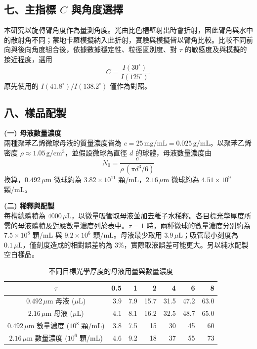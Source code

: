 \subsection*{七、主指標 $C$ 與角度選擇}
本研究以旋轉臂角度作為量測角度。光由比色槽壁射出時會折射，因此臂角與水中的散射角不同；蒙地卡羅模擬納入此折射，實驗與模擬皆以臂角比較。比較不同前向與後向角度組合後，依據數據穩定性、粒徑區別度、對 $\tau$ 的敏感度及與模擬的接近程度，選用
\[
C=\frac{I(30^\circ)}{I(125^\circ)}.
\]
原先使用的 $I(41.8^\circ)/I(138.2^\circ)$ 僅作為對照。

\subsection*{八、樣品配製}
\textbf{(一) 母液數量濃度}\\
兩種聚苯乙烯微球母液的質量濃度皆為 $c=25\,\mathrm{mg/mL}=0.025\,\mathrm{g/mL}$。以聚苯乙烯密度 $\rho\approx1.05\,\mathrm{g/cm^3}$，並假設微球為直徑 $d$ 的球體，母液數量濃度由
\[
N_0=\frac{c}{\rho\,(\pi d^3/6)}
\]
換算，$0.492\,\mu\mathrm{m}$ 微球約為 $3.82\times10^{11}$ 顆/mL，$2.16\,\mu\mathrm{m}$ 微球約為 $4.51\times10^9$ 顆/mL。

\medskip
\noindent\textbf{(二) 稀釋與配製}\\
每槽總體積為 $4000\,\mu\mathrm{L}$，以微量吸管取母液並加去離子水稀釋。各目標光學厚度所需的母液體積及對應數量濃度列於表中。$\tau=1$ 時，兩種微球的數量濃度分別約為 $7.5\times10^8$ 顆/mL 與 $9.2\times10^6$ 顆/mL。母液最少取用 $3.9\,\mu\mathrm{L}$；吸管最小刻度為 $0.1\,\mu\mathrm{L}$，僅刻度造成的相對誤差約為 $3\%$，實際取液誤差可能更大。另以純水配製空白樣品。

\begin{table}[H]
\centering
\caption{不同目標光學厚度的母液用量與數量濃度}
\label{tab:dilution}
\small
\renewcommand{\arraystretch}{1.2}
\begin{tabular}{c|rrrrrr}
    \toprule
    $\tau$ & 0.5 & 1 & 2 & 4 & 6 & 8 \\
    \midrule
    $0.492\,\mu\mathrm{m}$ 母液 ($\mu\mathrm{L}$) & 3.9 & 7.9 & 15.7 & 31.5 & 47.2 & 63.0 \\
    $2.16\,\mu\mathrm{m}$ 母液 ($\mu\mathrm{L}$) & 4.1 & 8.1 & 16.2 & 32.5 & 48.7 & 65.0 \\
    $0.492\,\mu\mathrm{m}$ 數量濃度 ($10^8$ 顆/mL) & 3.8 & 7.5 & 15 & 30 & 45 & 60 \\
    $2.16\,\mu\mathrm{m}$ 數量濃度 ($10^6$ 顆/mL) & 4.6 & 9.2 & 18 & 37 & 55 & 73 \\
    \bottomrule
\end{tabular}
\end{table}

